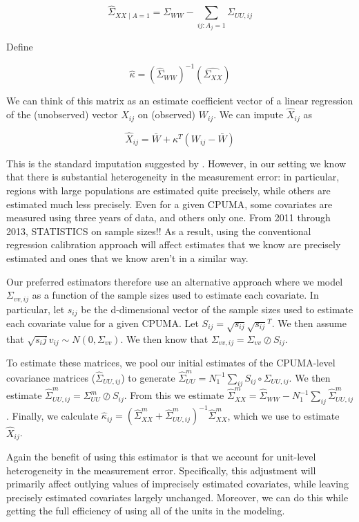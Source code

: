\documentclass[12pt]{article}
\begin{document}
$$
\hat{\Sigma}_{XX \mid A = 1} = \Sigma_{WW} - \sum_{ij: A_j = 1} \Sigma_{UU, ij}
$$

Define

$$
\hat{\kappa} = (\hat{\Sigma}_{WW})^{-1}(\hat{\Sigma_{XX}})
$$

We can think of this matrix as an estimate coefficient vector of a linear regression of the (unobserved) vector $X_{ij}$ on (observed) $W_{ij}$. We can impute $\hat{X}_{ij}$ as

$$
\hat{X}_{ij} = \bar{W} + \kappa^T(W_{ij} - \bar{W})
$$

This is the standard imputation suggested by \cite{carroll2006measurement}. However, in our setting we know that there is substantial heterogeneity in the measurement error: in particular, regions with large populations are estimated quite precisely, while others are estimated much less precisely. Even for a given CPUMA, some covariates are measured using three years of data, and others only one. From 2011 through 2013, STATISTICS on sample sizes!! As a result, using the conventional regression calibration approach will affect estimates that we know are precisely estimated and ones that we know aren't in a similar way. 

Our preferred estimators therefore use an alternative approach where we model $\Sigma_{vv, ij}$ as a function of the sample sizes used to estimate each covariate. In particular, let $s_{ij}$ be the d-dimensional vector of the sample sizes used to estimate each covariate value for a given CPUMA. Let $S_{ij} = \sqrt{s_{ij}}\sqrt{s_{ij}}^T$. We then assume that $\sqrt{s_ij}v_{ij} \sim N(0, \Sigma_{vv})$. We then know that $\Sigma_{vv, ij} = \Sigma_{vv} \oslash S_{ij}$. 

To estimate these matrices, we pool our initial estimates of the CPUMA-level covariance matrices ($\hat{\Sigma}_{UU, ij}$) to generate $\hat{\Sigma}_{UU}^m = N_1^{-1}\sum_{ij} S_{ij} \circ \Sigma_{UU, ij}$. We then estimate $\hat{\Sigma}_{UU, ij}^m = \Sigma_{UU}^m \oslash S_{ij}$. From this we estimate $\hat{\Sigma}^m_{XX} = \hat{\Sigma}_{WW} - N_1^{-1}\sum_{ij}\hat{\Sigma}^m_{UU, ij}$. Finally, we calculate $\hat{\kappa}_{ij} = (\hat{\Sigma}^m_{XX} + \hat{\Sigma}^m_{UU, ij})^{-1}\hat{\Sigma}^m_{XX}$, which we use to estimate $\hat{X}_{ij}$. 

Again the benefit of using this estimator is that we account for unit-level heterogeneity in the measurement error. Specifically, this adjustment will primarily affect outlying values of imprecisely estimated covariates, while leaving precisely estimated covariates largely unchanged. Moreover, we can do this while getting the full efficiency of using all of the units in the modeling. 
\end{document}
